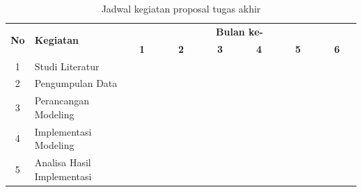 \begin{table}[h!]
  \centering
    \caption{Jadwal kegiatan proposal tugas akhir}
  \label{table:jadwal-kegiatan}
  \begin{tabular}{|c|m{3.5cm}|m{0.01cm}|m{0.01cm}|m{0.01cm}|m{0.01cm}|m{0.01cm}|m{0.01cm}|m{0.01cm}|m{0.01cm}|m{0.01cm}|m{0.01cm}|m{0.01cm}|m{0.01cm}|m{0.01cm}|m{0.01cm}|m{0.01cm}|m{0.01cm}|m{0.01cm}|m{0.01cm}|m{0.01cm}|m{0.01cm}|m{0.01cm}|m{0.01cm}|m{0.01cm}|m{0.01cm}|}
    \hline
    \multirow{2}{*}{\textbf{No}} & \multirow{2}{*}{\textbf{Kegiatan}} & \multicolumn{24}{|c|}{\textbf{Bulan ke-}} \\
    \hhline{~~------------------------}
    {} & {} & \multicolumn{4}{|c|}{\textbf{1}} & \multicolumn{4}{|c|}{\textbf{2}} & \multicolumn{4}{|c|}{\textbf{3}} & \multicolumn{4}{|c|}{\textbf{4}} & \multicolumn{4}{|c|}{\textbf{5}} & \multicolumn{4}{|c|}{\textbf{6}}\\
    \hline
    1 & Studi Literatur & \cellcolor{blue!25} & \cellcolor{blue!25} & \cellcolor{blue!25} & \cellcolor{blue!25}& \cellcolor{blue!25} & \cellcolor{blue!25} & \cellcolor{blue!25} & \cellcolor{blue!25}& \cellcolor{blue!25} & \cellcolor{blue!25} & \cellcolor{blue!25} & \cellcolor{blue!25}& \cellcolor{blue!25} & \cellcolor{blue!25} & \cellcolor{blue!25} & \cellcolor{blue!25}& \cellcolor{blue!25} & \cellcolor{blue!25} & \cellcolor{blue!25} & \cellcolor{blue!25}& \cellcolor{blue!25} & \cellcolor{blue!25} & \cellcolor{blue!25} & \cellcolor{blue!25}\\
    \hline
    2 & Pengumpulan Data & \cellcolor{blue!25} & \cellcolor{blue!25} & \cellcolor{blue!25} & \cellcolor{blue!25} & {} & {} & {} & {} & {} & {} & {} & {}& {} & {} & {} & {}& {} & {} & {} & {}& {} & {} & {} & {}\\
    \hline
    3 & Perancangan Modeling &  {} & {} & {} & {}  & \cellcolor{blue!25} & \cellcolor{blue!25} & \cellcolor{blue!25} & \cellcolor{blue!25} & \cellcolor{blue!25} & \cellcolor{blue!25} & \cellcolor{blue!25} & \cellcolor{blue!25} & {} & {} & {} & {}& {} & {} & {} & {}& {} & {} & {} & {}\\
    \hline
    4 & Implementasi Modeling &  {} & {} & {} & {} & {} & {} & {} & {}& \cellcolor{blue!25} & \cellcolor{blue!25} & \cellcolor{blue!25} & \cellcolor{blue!25} & \cellcolor{blue!25} & \cellcolor{blue!25} & \cellcolor{blue!25} & \cellcolor{blue!25} & {} & {} & {} & {}& {} & {} & {} & {}\\
    \hline
    5 & Analisa Hasil Implementasi &  {} & {} & {} & {} & {} & {} & {} & {}& {} & {} & {} & {} & \cellcolor{blue!25} & \cellcolor{blue!25} & \cellcolor{blue!25} & \cellcolor{blue!25} & \cellcolor{blue!25} & \cellcolor{blue!25} & \cellcolor{blue!25} & \cellcolor{blue!25} & {} & {} & {} & {}\\

\end{tabular}
\end{table}
